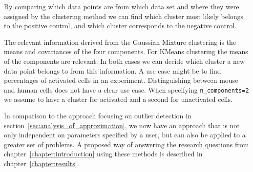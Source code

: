 By comparing which data points are from which data set and where they were assigned by the clustering method we can find which cluster most likely belongs to the positive control, and which cluster corresponds to the negative control.

The relevant information derived from the Gaussian Mixture clustering is the means and covariances of the four components. For KMeans clustering the means of the components are relevant. In both cases we can decide which cluster a new data point belongs to from this information. A use case might be to find percentages of activated cells in an experiment. Distinguishing between mouse and human cells does not have a clear use case. When specifying \texttt{n\_components=2} we assume to have a cluster for activated and a second for unactivated cells.

In comparison to the approach focusing on outlier detection in section~\ref{sec:analysis_of_approximation}, we now have an approach that is not only independent on parameters specified by a user, but can also be applied to a greater set of problems. A proposed way of answering the research questions from chapter~\ref{chapter:introduction} using these methods is described in chapter~\ref{chapter:results}.